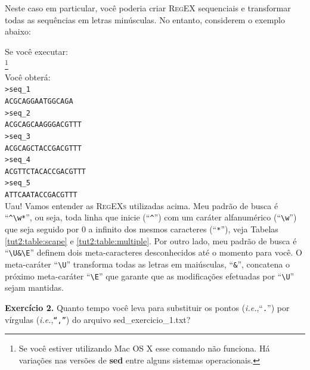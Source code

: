 \begin{refsection}
Neste caso em particular, você poderia criar \textsc{RegEX} sequenciais e transformar todas as sequências em letras minúsculas. No entanto, considerem o exemplo abaixo:

Se você executar:\\
\footnote{Se você estiver utilizando Mac OS X esse comando não funciona. Há variações nas versões de \textbf{sed} entre alguns sistemas operacionais.}\\

Você obterá:\\
\texttt{>seq\_1}\\
\texttt{ACGCAGGAATGGCAGA}\\
\texttt{>seq\_2}\\
\texttt{ACGCAGCAAGGGACGTTT}\\
\texttt{>seq\_3}\\
\texttt{ACGCAGCTACCGACGTTT}\\
\texttt{>seq\_4}\\
\texttt{ACGTTCTACACCGACGTTT}\\
\texttt{>seq\_5}\\
\texttt{ATTCAATACCGACGTTT}\\

Uau! Vamos entender as \textsc{RegEXs} utilizadas acima. Meu padrão de busca é ``\texttt{\^{}\textbackslash w*}'', ou seja, toda linha que inicie (``\texttt{\^{}}'') com um caráter alfanumérico (``\texttt{\textbackslash w}'') que seja seguido por 0 a infinito dos mesmos caracteres (``\texttt{*}''), veja Tabelas \ref{tut2:table:scape} e \ref{tut2:table:multiple}. Por outro lado, meu padrão de busca é ``\texttt{\textbackslash U\&\textbackslash E}'' definem dois meta-caracteres desconhecidos até o momento para você. O meta-caráter ``\texttt{\textbackslash U}'' transforma todas as letras em maiúsculas, ``\texttt{\&}'', concatena o próximo meta-caráter ``\texttt{\textbackslash E}'' que garante que as modificações efetuadas por ``\texttt{\textbackslash U}'' sejam mantidas.\\


\begin{blackBlock}{\textbf{Exercício 2.}}\label{tut2:ex:2.\arabic{ex}}
Quanto tempo você leva para substituir os pontos (\textit{i.e.},``\texttt{.}'') por vírgulas (\textit{i.e.},\texttt{``,''}) do arquivo sed\_exercicio\_1.txt?


\end{blackBlock}
\end{refsection}
